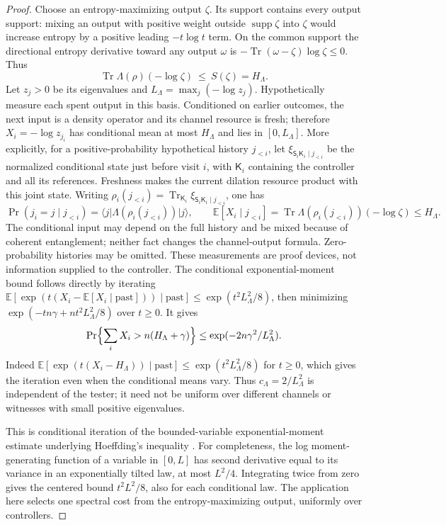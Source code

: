 \documentclass[11pt,a4paper]{article}
\numberwithin{equation}{section}
\theoremstyle{plain}
\theoremstyle{definition}
\DeclareMathOperator{\Tr}{Tr}
\DeclareMathOperator{\supp}{supp}
\newcommand{\rg}[1]{\mathsf{#1}}
\newcommand{\ket}[1]{\lvert #1 \rangle}
\newcommand{\bra}[1]{\langle #1 \rvert}
\begin{document}
\begin{proof}
Choose an entropy-maximizing output $\zeta$. Its support contains every output
support: mixing an output with positive weight outside $\supp\zeta$ into
$\zeta$ would increase entropy by a positive leading $-t\log t$ term. On the
common support the directional entropy derivative toward any output $\omega$
is $-\Tr(\omega-\zeta)\log\zeta\le 0$. Thus
\[
\Tr\Lambda(\rho)(-\log\zeta)\ \le\ S(\zeta)=H_\Lambda .
\]
Let $z_j>0$ be its eigenvalues and $L_\Lambda=\max_j(-\log z_j)$.
Hypothetically measure each spent output in this basis. Conditioned on earlier
outcomes, the next input is a density operator and its channel resource is
fresh; therefore $X_i=-\log z_{j_i}$ has conditional mean at most $H_\Lambda$
and lies in $[0,L_\Lambda]$. More explicitly, for a positive-probability
hypothetical history $j_{<i}$, let $\xi_{\rg{S}_i\rg{K}_i\mid j_{<i}}$ be the
normalized conditional state just before visit $i$, with $\rg{K}_i$ containing
the controller and all its references. Freshness makes the current dilation
resource product with this joint state. Writing
$\rho_i(j_{<i})=\Tr_{\rg{K}_i}\xi_{\rg{S}_i\rg{K}_i\mid j_{<i}}$, one has
\[
\Pr(j_i=j\mid j_{<i})=\bra{j}\Lambda(\rho_i(j_{<i}))\ket{j},
\qquad
\mathbb{E}[X_i\mid j_{<i}]=\Tr\Lambda(\rho_i(j_{<i}))(-\log\zeta)\le H_\Lambda.
\]
The conditional input may depend on the full history and be mixed because of
coherent entanglement; neither fact changes the channel-output formula.
Zero-probability histories may be omitted. These measurements are proof
devices, not information supplied to the controller. The conditional
exponential-moment bound follows directly by iterating
$\mathbb{E}[\exp(t(X_i-\mathbb{E}[X_i\mid\text{past}]))\mid\text{past}]
\le\exp(t^2L_\Lambda^2/8)$, then minimizing
$\exp(-tn\gamma+nt^2L_\Lambda^2/8)$ over $t\ge 0$. It gives
\[
\Pr\Bigl\{\sum_i X_i>n(H_\Lambda+\gamma)\Bigr\}
\le\exp(-2n\gamma^2/L_\Lambda^2).
\]
Indeed $\mathbb{E}[\exp(t(X_i-H_\Lambda))\mid\text{past}]
\le\exp(t^2L_\Lambda^2/8)$ for $t\ge 0$, which gives the iteration even when
the conditional means vary. Thus $c_\Lambda=2/L_\Lambda^2$ is independent of
the tester; it need not be uniform over different channels or witnesses with
small positive eigenvalues.

This is conditional iteration of the bounded-variable exponential-moment
estimate underlying Hoeffding's inequality \cite{Hoeffding1963}. For
completeness, the log moment-generating function of a variable in $[0,L]$ has
second derivative equal to its variance in an exponentially tilted law, at
most $L^2/4$. Integrating twice from zero gives the centered bound $t^2L^2/8$,
also for each conditional law. The application here selects one spectral cost
from the entropy-maximizing output, uniformly over controllers.


\end{proof}
\end{document}

